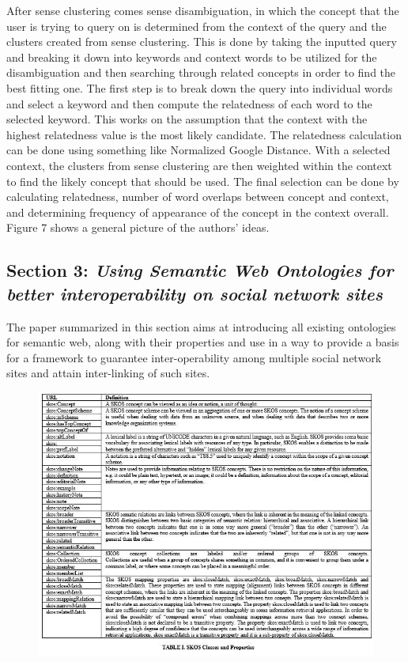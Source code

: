 \documentclass[10pt,journal,compsoc]{IEEEtran}
\begin{document}
After sense clustering comes sense disambiguation, in which the concept that the user is trying to query on is determined from the context of the query and the clusters created from sense clustering. This is done by taking the inputted query and breaking it down into keywords and context words to be utilized for the disambiguation and then searching through related concepts in order to find the best fitting one. The first step is to break down the query into individual words and select a keyword and then compute the relatedness of each word to the selected keyword. This works on the assumption that the context with the highest relatedness value is the most likely candidate. The relatedness calculation can be done using something like Normalized Google Distance. With a selected context, the clusters from sense clustering are then weighted within the context to find the likely concept that should be used. The final selection can be done by calculating relatedness, number of word overlaps between concept and context, and determining frequency of appearance of the concept in the context overall. Figure 7 shows a general picture of the authors' ideas.




\subsection{Section 3: \textit{Using Semantic Web Ontologies for better interoperability on social network sites} \cite{6190504}}
The paper summarized in this section aims at introducing all existing ontologies for semantic web, along with their properties and use in a way to provide a basis for a framework to guarantee inter-operability among multiple social network sites and attain inter-linking of such sites.

\begin{figure}[hbt]
\begin{center}
\includegraphics[width=6in]{DanielaTable1.JPG}       
\label{fig1}
\end{center}
\end{figure}
\end{document}
